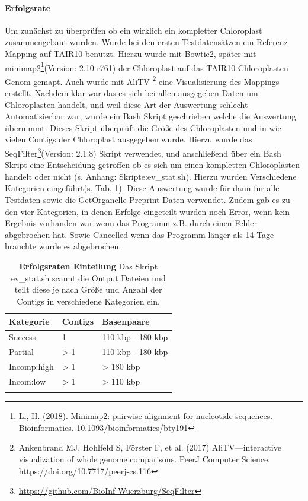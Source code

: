 \documentclass{scrartcl}
\begin{document}
\paragraph{Erfolgsrate}
\label{sec-3-1-2-2}
Um zunächst zu überprüfen ob ein wirklich ein kompletter Chloroplast zusammengebaut wurden. Wurde bei den ersten Testdatensätzen ein Referenz Mapping auf
TAIR10 benutzt. Hierzu wurde mit Bowtie2, später mit minimap2\footnote{Li, H. (2018). Minimap2: pairwise alignment for nucleotide sequences. Bioinformatics. \url{10.1093/bioinformatics/bty191}}(Version: 2.10-r761)  der Chloroplast auf das TAIR10 Chloroplasten Genom gemapt. Auch wurde mit AliTV \footnote{Ankenbrand MJ, Hohlfeld S, Förster F, et al. (2017) AliTV—interactive visualization of whole genome comparisons. PeerJ Computer Science, \url{https://doi.org/10.7717/peerj-cs.116}} 
eine Visualisierung des Mappings erstellt. Nachdem klar war das es sich bei allen ausgegeben Daten um Chloroplasten handelt, und weil diese Art der 
Auswertung schlecht Automatisierbar war, wurde ein Bash Skript geschrieben welche die Auswertung übernimmt. Dieses Skript überprüft die Größe des
Chloroplasten und in wie vielen Contigs der Chloroplast ausgegeben wurde. Hierzu wurde das SeqFilter\footnote{\url{https://github.com/BioInf-Wuerzburg/SeqFilter}}(Version: 2.1.8) Skript verwendet, und anschließend über ein Bash
Skript eine Entscheidung getroffen ob es sich um einen kompletten Chloroplasten handelt oder nicht (s. Anhang: Skripte:ev\_stat.sh). Hierzu wurden Verschiedene
Kategorien eingeführt(s. Tab. 1). Diese Auswertung wurde für dann für alle Testdaten sowie die GetOrganelle Preprint Daten verwendet. Zudem gab es zu den vier Kategorien, in denen
Erfolge eingeteilt wurden noch Error, wenn kein Ergebnis vorhanden war wenn das Programm z.B. durch einen Fehler abgebrochen hat. Sowie Cancelled wenn das Programm länger als 14 Tage brauchte 
wurde es abgebrochen.
\begin{table}[!h]
\caption[Erfolgsraten Einteilung]{\textbf{Erfolgsraten Einteilung} Das Skript ev\_stat.sh scannt die Output Dateien und teilt diese je nach Größe und Anzahl der Contigs in verschiedene Kategorien ein. }
\begin{center}
\begin{tabular}{lll}
Kategorie & Contigs & Basenpaare\\
\hline
Success & 1 & 110 kbp - 180 kbp\\
Partial & > 1 & 110 kbp - 180 kbp\\
Incomp:high & > 1 & > 180 kbp\\
Incom:low & > 1 & > 110 kbp\\
 &  & \\
\end{tabular}
\end{center}
\end{table}
\end{document}
